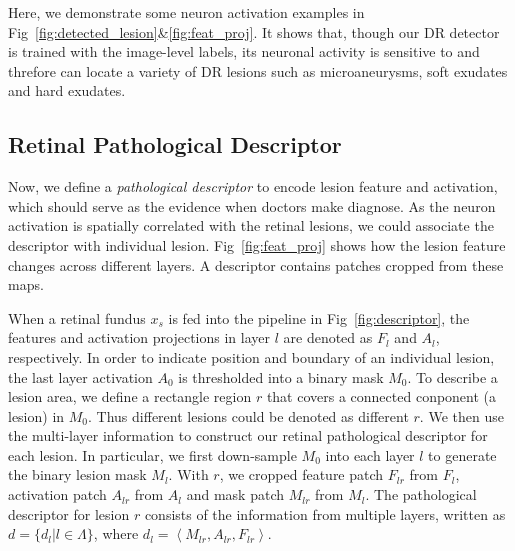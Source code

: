 \documentclass[letterpaper]{article} %
\begin{document}
    Here, we demonstrate some neuron activation examples in Fig~\ref{fig:detected_lesion}\&\ref{fig:feat_proj}. It shows that, though our DR detector is trained with the image-level labels,
    its neuronal activity is sensitive to and threfore can locate a variety of DR lesions such as microaneurysms, soft exudates and hard exudates.
    
	
	\subsection{Retinal Pathological Descriptor}
    
    Now, we define a \emph{pathological descriptor} to encode lesion feature and activation, which should serve as the evidence when doctors make diagnose. As the neuron activation is spatially correlated with the retinal lesions, we could associate the descriptor with individual lesion.  Fig~\ref{fig:feat_proj} shows how the lesion feature changes across different layers. A descriptor contains patches cropped from these maps.
   
	
	When a retinal fundus $ x_s $ is fed into the pipeline in Fig~\ref{fig:descriptor}, the features and activation projections in layer $ l $ are denoted as $ F_l $ and $ A_l $, respectively. In order to indicate position and boundary of an individual lesion, the last layer activation $ A_0 $ is thresholded into a binary mask $ M_0 $. To describe a lesion area, we define a rectangle region $r$ that covers a connected conponent (a lesion) in $ M_0 $. Thus different lesions could be denoted as different $r$. We then use the multi-layer information to construct our retinal pathological descriptor for each lesion. In particular, we first down-sample $M_0$ into each layer $l$ to generate the binary lesion mask $M_l$. With $r$, we cropped feature patch $F_{lr}$ from $F_l$, activation patch $A_{lr}$ from $A_l$ and mask patch $M_{lr}$ from $M_l$. The pathological descriptor for lesion $r$ consists of the information from multiple layers, written as $d = \{d_{l}|l\in \Lambda\}$, where $ d_{l} = \left<M_{lr}, A_{lr}, F_{lr}\right> $.
\end{document}
